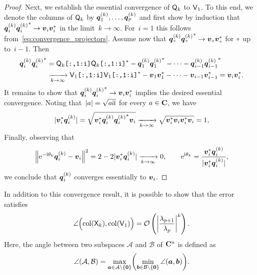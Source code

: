 \begin{proof}
    Next, we establish the essential convergence of $\mat Q_k$ to $\mat V_1$.
    To this end, we denote the columns of $\mat Q_k$ by $\vect q_1^{(k)}, \dotsc, \vect q_p^{(k)}$ and first show by induction that
    $\vect q_i^{(k)} {\vect q_i^{(k)}}^* \to \vect v_i \vect v_i^*$ in the limit~$k \to \infty$.
    For~$i = 1$ this follows from~\eqref{eq:convergence_projectors}.
    Assume now that $\vect q_{\placeholder}^{(k)} {\vect q_{\placeholder}^{(k)}}^* \to \vect v_{\placeholder} \vect v_{\placeholder}^*$ for $\placeholder$ up to~$i-1$.
    Then
    \begin{align*}
        \vect q_{i}^{(k)} {\vect q_{i}^{(k)}}^*
        &= \mat Q_k \texttt{[:,1:i]} \mat Q_k \texttt{[:,1:i]}^* - \vect q_1^{(k)} {\vect q_1^{(k)}}^* - \dotsb - \vect q_{i-1}^{(k)} {\vect q_{i-1}^{(k)}}^* \\
        &\xrightarrow[k \to \infty]{} \mat V_1\texttt{[:,1:i]} \mat V_1\texttt{[:,1:i]}^* - \vect v_1 \vect v_1^* - \dotsb - \vect v_{i-1} \vect v_{i-1}^* = \vect v_{i} \vect v_{i}^{*}.
    \end{align*}
    It remains to show that $\vect q_i^{(k)} {\vect q_i^{(k)}}^* \to \vect v_i \vect v_i^*$ implies the desired essential convergence.
    Noting that~$\abs{a} = \sqrt{a \overline a}$ for every $a \in \complex$,
    we have
    \[
        \abs{\vect v_i^* \vect q_i^{(k)}} = \sqrt{\vect v_i^* \vect q_i^{(k)} {\vect q_i^{(k)}}^* \vect v_i}
        \xrightarrow[k \to \infty]{} \sqrt{\vect v_i^* \vect v_i \vect v_i^* \vect v_i} = 1,
    \]
    Finally, observing that
    \[
        \norm*{\e^{-\i \theta_k}\vect q_i^{(k)} - \vect v_i}^2
        = 2 - 2 \abs{\vect v_i^* \vect q_i^{(k)}} \xrightarrow[k \to \infty]{} 0, \qquad
        \e^{\i\theta_k} = \frac{\vect v_i^* \vect q_i^{(k)}}{\abs{\vect v_i^* \vect q_i^{(k)}}},
    \]
    we conclude that $\vect q_i^{(k)}$ converges essentially to $\vect v_i$.
\end{proof}

In addition to this convergence result,
it is possible to show that the error satisfies
\[
    \angle \Bigl(\col(\mat X_k), \col(\mat V_1)\Bigr)
    = \bigo \left( \abs*{\frac{\lambda_{p+1}}{\lambda_p}}^k \right).
\]
Here,
the angle between two subspaces $\mathcal A$ and $\mathcal B$ of $\complex^n$ is defined as
\[
    \angle (\mathcal A, \mathcal B) = \max_{\vect a \in \mathcal A \backslash \{\vect 0\}} \biggl( \min_{\vect b \in \mathcal B \backslash \{\vect 0\}} \angle(\vect a, \vect b) \biggr).
\]

